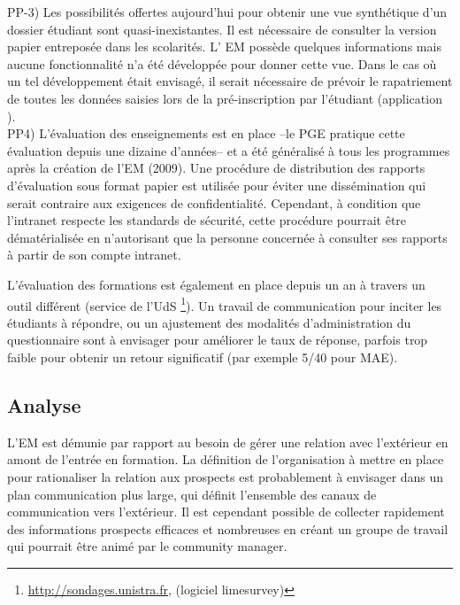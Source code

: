 \documentclass{book}
\begin{document}
PP-3) Les  possibilités offertes  aujourd'hui pour  obtenir une  vue synthétique
d'un dossier étudiant sont quasi-inexistantes. Il est nécessaire de consulter la
version papier  entreposée dans  les scolarités. L'  EM possède
quelques informations mais aucune fonctionnalité  n'a été développée pour donner
cette  vue. Dans  le  cas où  un  tel développement  était  envisagé, il  serait
nécessaire de prévoir  le rapatriement de toutes les données  saisies lors de la
pré-inscription par l'étudiant (application ).\\


PP4)  L'évaluation  des enseignements  est  en  place  --le PGE  pratique  cette
évaluation  depuis  une dizaine  d'années--  et  a  été  généralisé à  tous  les
programmes après la  création de l'EM (2009). Une procédure  de distribution des
rapports  d'évaluation  sous   format  papier  est  utilisée   pour  éviter  une
dissémination qui serait contraire  aux exigences de confidentialité. Cependant,
à condition que  l'intranet respecte les standards de  sécurité, cette procédure
pourrait  être  dématérialisée  en  n'autorisant que  la  personne  concernée  à
consulter ses rapports à partir de son compte intranet.

L'évaluation des formations est également en place depuis un an à travers 
un outil différent (service de l'UdS%
\footnote{\url{http://sondages.unistra.fr},   (logiciel    limesurvey)}).    Un
 travail  de  communication  pour  inciter  les  étudiants  à  répondre,  ou  un
 ajustement  des modalités  d'administration du  questionnaire sont  à envisager
 pour améliorer le  taux de réponse, parfois trop faible  pour obtenir un retour
 significatif (par exemple 5/40 pour MAE).  \\



\subsection{Analyse}

L'EM est démunie par rapport au besoin de gérer une relation avec l'extérieur en
amont de  l'entrée en  formation. La  définition de  l'organisation à  mettre en
place pour rationaliser  la relation aux prospects est  probablement à envisager
dans un  plan communication  plus large,  qui définit  l'ensemble des  canaux de
communication  vers   l'extérieur.  Il  est  cependant   possible  de  collecter
rapidement  des informations  prospects  efficaces et  nombreuses  en créant  un
groupe de travail qui pourrait être animé par le community manager.
\end{document}
